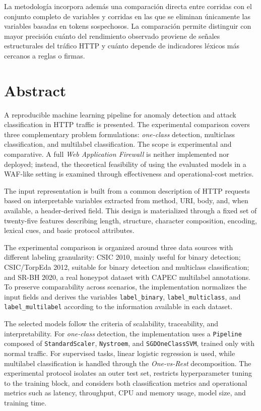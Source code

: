 \documentclass[12pt,oneside]{report}
\begin{document}
La metodología incorpora además una comparación directa entre corridas con el conjunto completo de variables y corridas en las que se eliminan únicamente las variables basadas en tokens sospechosos. La comparación permite distinguir con mayor precisión cuánto del rendimiento observado proviene de señales estructurales del tráfico HTTP y cuánto depende de indicadores léxicos más cercanos a reglas o firmas.

\chapter*{Abstract}
A reproducible machine learning pipeline for anomaly detection and attack classification in HTTP traffic is presented. The experimental comparison covers three complementary problem formulations: \textit{one-class} detection, multiclass classification, and multilabel classification. The scope is experimental and comparative. A full \textit{Web Application Firewall} is neither implemented nor deployed; instead, the theoretical feasibility of using the evaluated models in a WAF-like setting is examined through effectiveness and operational-cost metrics.

The input representation is built from a common description of HTTP requests based on interpretable variables extracted from method, URI, body, and, when available, a header-derived field. This design is materialized through a fixed set of twenty-five features describing length, structure, character composition, encoding, lexical cues, and basic protocol attributes.

The experimental comparison is organized around three data sources with different labeling granularity: CSIC 2010, mainly useful for binary detection; CSIC/TorpEda 2012, suitable for binary detection and multiclass classification; and SR-BH 2020, a real honeypot dataset with CAPEC multilabel annotations. To preserve comparability across scenarios, the implementation normalizes the input fields and derives the variables \texttt{label\_binary}, \texttt{label\_multiclass}, and \texttt{label\_multilabel} according to the information available in each dataset.

The selected models follow the criteria of scalability, traceability, and interpretability. For \textit{one-class} detection, the implementation uses a \texttt{Pipeline} composed of \texttt{StandardScaler}, \texttt{Nystroem}, and \texttt{SGDOneClassSVM}, trained only with normal traffic. For supervised tasks, linear logistic regression is used, while multilabel classification is handled through the \textit{One-vs-Rest} decomposition. The experimental protocol isolates an outer test set, restricts hyperparameter tuning to the training block, and considers both classification metrics and operational metrics such as latency, throughput, CPU and memory usage, model size, and training time.
\end{document}
